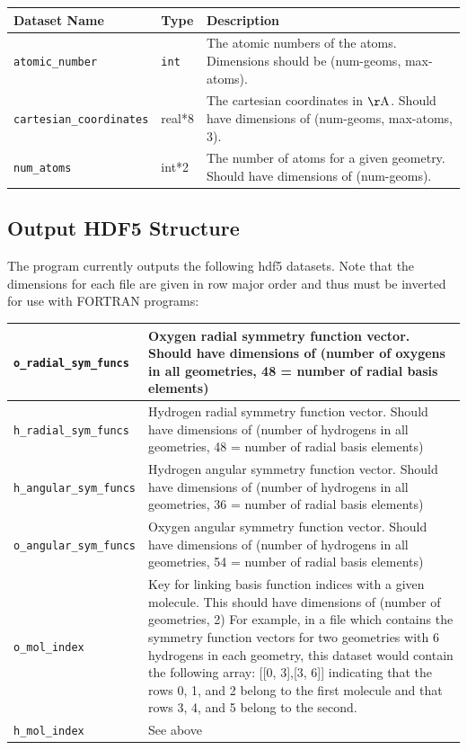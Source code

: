 \documentclass{article}
\begin{document}
\begin{tabular}{| l | l | p{5.1cm} |}
\hline
Dataset Name & Type & Description \\
\hline
\texttt{atomic\_number} & \texttt{int\*1} & The atomic numbers of the atoms. Dimensions should be (num-geoms, max-atoms). \\
\texttt{cartesian\_coordinates} & real*8 & The cartesian coordinates in $\mathrm{\AA}$. Should have dimensions of (num-geoms, max-atoms, 3). \\
\texttt{num\_atoms} & int*2 & The number of atoms for a given geometry. Should have dimensions of (num-geoms). \\
\hline
\end{tabular}

\subsection{Output HDF5 Structure}
The program currently outputs the following hdf5 datasets. Note that the dimensions for each file are given in row major order and thus must be inverted for use with FORTRAN programs:

\begin{tabular}{|l | p{7.0cm} |}
\hline
\texttt{o\_radial\_sym\_funcs} & Oxygen radial symmetry function vector. Should have dimensions of (number of oxygens in all geometries, 48 = number of radial basis elements) \\ \hline
\texttt{h\_radial\_sym\_funcs} & Hydrogen radial symmetry function vector. Should have dimensions of (number of hydrogens in all geometries, 48 = number of radial basis elements) \\ \hline
\texttt{h\_angular\_sym\_funcs} & Hydrogen angular symmetry function vector. Should have dimensions of (number of hydrogens in all geometries, 36 = number of radial basis elements) \\ \hline
\texttt{o\_angular\_sym\_funcs} & Oxygen angular symmetry function vector. Should have dimensions of (number of hydrogens in all geometries, 54 = number of radial basis elements) \\ \hline
\texttt{o\_mol\_index} & Key for linking basis function indices with a given molecule. This should have dimensions of (number of geometries, 2) For example, in a file which contains the symmetry function vectors for two geometries with 6 hydrogens in each geometry, this dataset would contain the following array: [[0, 3],[3, 6]] indicating that the rows 0, 1, and 2 belong to the first molecule and that rows 3, 4, and 5 belong to the second. \\ \hline
\texttt{h\_mol\_index} & See above \\
\hline
\end{tabular}
\end{document}
